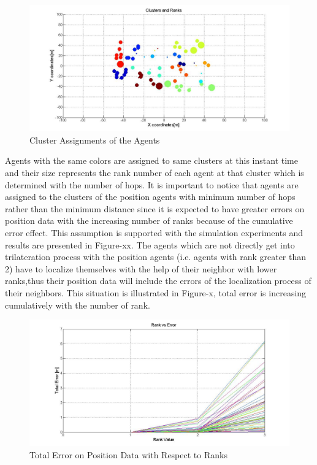 		\begin{figure}[H]
			\caption{Cluster Assignments of the Agents}
		\centerline{\includegraphics[scale = 0.4]{Clusters_Ranks_1}}
			\end{figure} 
	Agents with the same colors are assigned to same clusters at this instant time and their size represents the rank number of each agent at that cluster which is determined with the number of hops. It is important to notice that agents are assigned to the clusters of the position agents with minimum number of hops rather than the minimum distance since it is expected to have greater errors on position data with the increasing number of ranks because of the cumulative error effect. This assumption is supported with the simulation experiments and results are presented in Figure-xx. 
The agents which are not directly get into trilateration process with the position agents (i.e. agents with rank greater than 2) have to localize themselves with the help of their neighbor with lower ranks,thus their position data will include the errors of the localization process of their neighbors. This situation is illustrated in Figure-x, total error is increasing cumulatively with the number of rank. 
	

			\begin{figure}[H]
				\caption{Total Error on Position Data with Respect to Ranks}
				\centerline{\includegraphics[scale = 0.4]{Rank_vs_Error}}
		\end{figure} 
	
